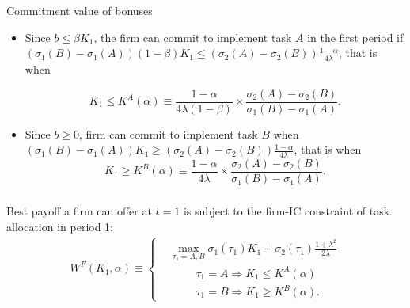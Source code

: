 \documentclass[slides,english,compress]{beamer}
\begin{document}
\begin{frame}
	\frametitle{}
	
\begin{block}{Commitment value of bonuses}
		\begin{itemize}
			\item 
		Since  $b\leq\beta K_1$,  the firm can commit to implement task $A$ in the first period if $( \sigma_1(B)- \sigma_1(A))(1-\beta)K_1\leq(\sigma_2(A)-\sigma_2(B))\frac{1-\alpha}{4\lambda} $, that is when 

\begin{equation*}
K_1\leq K^A(\alpha)\equiv   \frac{1-\alpha}{4 \lambda (1-\beta) }\times \frac{ \sigma_2(A)- \sigma_2(B)}{ \sigma_1(B)- \sigma_1(A)}.
\end{equation*}

\item Since $b\geq 0$, firm can commit to implement task $B$ when
$(\sigma_1(B)-\sigma_1(A))K_1 \geq (\sigma_2(A)-\sigma_2(B))\frac{1-\alpha}{4\lambda}$, that is when
\begin{equation*}%
K_1\geq K^B(\alpha)\equiv \frac{1-\alpha}{4 \lambda } \times \frac{ \sigma_2(A)- \sigma_2(B)}{ \sigma_1(B)- \sigma_1(A)} .
\end{equation*}
		\end{itemize}
		
\end{block}

\end{frame}
\begin{frame}
	\frametitle{}

Best payoff a firm can offer at $t=1$ is subject to the firm-IC constraint of task allocation in period 1:
\begin{align*}
W^F(K_1,\alpha) \equiv \begin{cases}
&\max_{\tau_1=A,B} \sigma_1(\tau_1)K_1+\sigma_2(\tau_1)\frac{1+\lambda^2}{2\lambda}\\
& \hspace{1cm} \tau_1=A\Rightarrow K_1\leq K^A(\alpha)\\
& \hspace{1cm} \tau_1=B\Rightarrow K_1\geq K^B(\alpha).
\end{cases}
\end{align*}


\vspace{0.5cm}
\end{frame}
\end{document}
